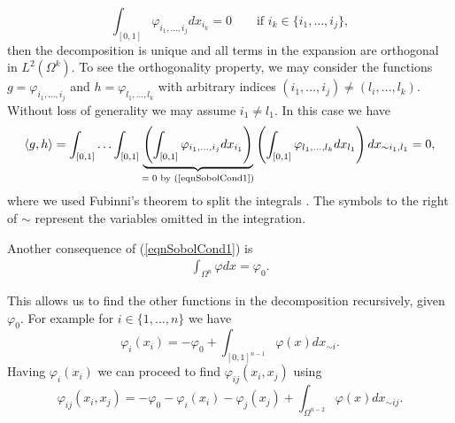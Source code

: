 \documentclass[12pt]{book}
\begin{document}
\begin{equation}\label{eqnSobolCond1}
\int_{[0,1]}\varphi_{i_{1},\ldots,i_{j}}dx_{i_{k}}=0\qquad\text{if }  i_{k}\in \{i_{1},\ldots,i_{j}\},
\end{equation}
then the decomposition is unique and all terms in the expansion are orthogonal in $L^{2}(\Omega^{k})$. To 
see the orthogonality property, 
we may  consider the functions $g=\varphi_{i_{1},\ldots,i_{j}}$ and $h=\varphi_{l_{1},\ldots,l_{k}}$ 
with arbitrary indices $(i_{1},\ldots,i_{j})\neq(l_{i},\ldots,l_{k})$. Without 
loss of generality we may  assume $i_{1}\neq l_{1}$. In this case we have
\begin{equation*}
\langle g,h\rangle=\int_{[0,1]}\ldots\int_{[0,1]}\underbrace{\left(\int_{[0,1]}\varphi_{i_{1},
\ldots,i_{j}}dx_{i_{1}}\right)}_{\text{$=0$ by (\ref{eqnSobolCond1})}}
\left(\int_{[0,1]}\varphi_{l_{1},\ldots,l_{k}}dx_{l_{1}}\right)dx_{\sim i_{1},l_{1}}=0,
\end{equation*}
where we used Fubinni's theorem to split the integrals \cite{lerner2014course}. The symbols to the right of $\sim$ 
represent the variables omitted in the integration.

Another consequence of  (\ref{eqnSobolCond1}) is 
\begin{eqnarray*}
\int_{\Omega^{n}}\varphi dx=\varphi_{0}.
\end{eqnarray*}

This allows us to find  the other functions in the decomposition recursively,
given $\varphi_{0}$. For example 
for $i\in \{1,\ldots,n\}$ we have
\begin{equation*}
\varphi_{i}(x_{i})=-\varphi_{0}+\int_{[0,1]^{n-1}}\varphi(x)dx_{\sim i}.
\end{equation*}
Having $\varphi_{i}(x_{i})$ we can proceed to find $\varphi_{ij}(x_{i},x_{j})$ using
\begin{equation*}
\varphi_{ij}(x_{i},x_{j})=-\varphi_{0}-\varphi_{i}(x_{i})-\varphi_{j}(x_{j})+
\int_{\Omega^{n-2}}\varphi(x)dx_{\sim ij}.
\end{equation*}
\end{document}

